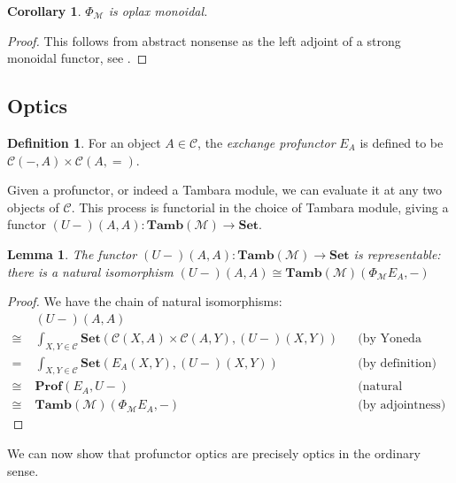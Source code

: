 \documentclass[11pt,a4paper]{article}
\theoremstyle{plain}
\newtheorem{lemma}[theorem]{Lemma}
\newtheorem{corollary}[theorem]{Corollary}
\theoremstyle{definition}
\newtheorem{definition}[theorem]{Definition}
\newcommand{\C}{\mathscr{C}}
\newcommand{\M}{\mathscr{M}}
\newcommand{\Pastro}{\Phi}
\newcommand{\Set}{\mathbf{Set}}
\newcommand{\Prof}{\mathbf{Prof}}
\newcommand{\Tamb}{\mathbf{Tamb}}
\begin{document}
\begin{corollary}
  $\Pastro_\M$ is oplax monoidal.
\end{corollary}
\begin{proof}
  This follows from abstract nonsense as the left adjoint of a strong monoidal functor, see \cite{Kelly1974}.
\end{proof}

\subsection{Optics}
\begin{definition}
  For an object $A \in \C$, the \emph{exchange profunctor} $E_A$ is defined to be $\C(-, A) \times \C(A, {=})$.
\end{definition}

Given a profunctor, or indeed a Tambara module, we can evaluate it at any two objects of $\C$. This process is functorial in the choice of Tambara module, giving a functor $(U-)(A,A) : \Tamb(\M) \to \Set$.

\begin{lemma}\label{lemma-rep}
  The functor $(U-)(A,A) : \Tamb(\M) \to \Set$ is representable: there is a natural isomorphism
  $(U-)(A,A) \cong \Tamb(\M)(\Pastro_\M E_A, -)$
\end{lemma}
\begin{proof}
  We have the chain of natural isomorphisms:
  \begin{align*}
    &(U-)(A,A) \\
    \cong \;&\int_{X,Y \in \C} \Set(\C(X,A) \times \C(A,Y), (U-)(X,Y)) && \text{(by Yoneda (un)reduction twice)} \\
    =\;&\int_{X,Y \in \C} \Set(E_A(X,Y), (U-)(X,Y)) && \text{(by definition)}\\
    \cong \;&\Prof(E_A, U-) && \text{(natural transformations as ends)} \\
    \cong \;&\Tamb(\M)(\Pastro_\M E_A, -) && \text{(by adjointness)}
  \end{align*}
\end{proof}

We can now show that profunctor optics are precisely optics in the ordinary sense.
\end{document}
